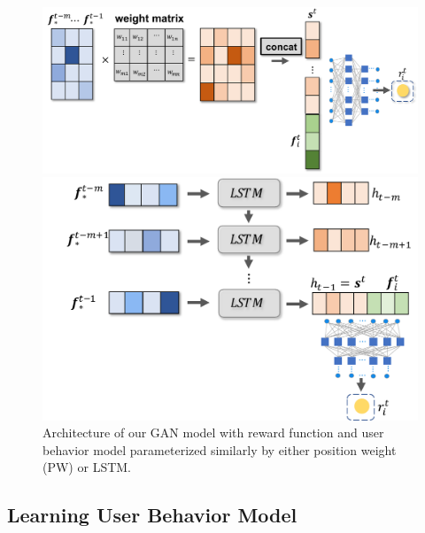 \documentclass{article} %
\begin{document}
\begin{figure}[htbp]
    \vspace{-3mm}
  \begin{minipage}[c]{0.53\textwidth}
    \centering
    \includegraphics[width=\textwidth]{Figs/PABOW.pdf}
  \end{minipage}
  \begin{minipage}[c]{0.42\textwidth}
    \centering
    \includegraphics[width=\textwidth]{Figs/LSTM.pdf}
  \end{minipage}\hfill
    \vspace{-3mm}
  \caption{\small Architecture of our GAN model with reward function and user behavior model parameterized similarly by either position weight (PW) or LSTM. 
    }
    \label{fg:usermodel}
    \vspace{-3mm}
\end{figure}

\vspace{-3mm}
\subsection{Learning User Behavior Model}
\vspace{-3mm}
\end{document}
